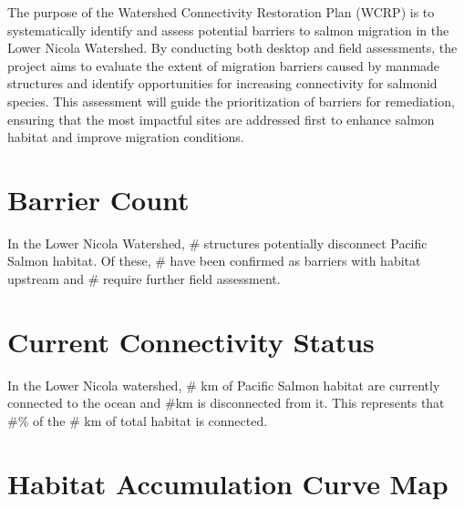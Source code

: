\documentclass[
  letterpaper,
  DIV=11,
  numbers=noendperiod]{scrreprt}
\begin{document}

The purpose of the Watershed Connectivity Restoration Plan (WCRP) is to
systematically identify and assess potential barriers to salmon
migration in the Lower Nicola Watershed. By conducting both desktop and
field assessments, the project aims to evaluate the extent of migration
barriers caused by manmade structures and identify opportunities for
increasing connectivity for salmonid species. This assessment will guide
the prioritization of barriers for remediation, ensuring that the most
impactful sites are addressed first to enhance salmon habitat and
improve migration conditions.

\hypertarget{barrier-count}{%
\section*{Barrier Count}\label{barrier-count}}


In the Lower Nicola Watershed, \# structures potentially disconnect
Pacific Salmon habitat. Of these, \# have been confirmed as barriers
with habitat upstream and \# require further field assessment.

\hypertarget{current-connectivity-status}{%
\section*{Current Connectivity
Status}\label{current-connectivity-status}}


In the Lower Nicola watershed, \# km of Pacific Salmon habitat are
currently connected to the ocean and \#km is disconnected from it. This
represents that \#\% of the \# km of total habitat is connected.

\hypertarget{habitat-accumulation-curve-map}{%
\section*{Habitat Accumulation Curve \textbar{}
Map}\label{habitat-accumulation-curve-map}}

\end{document}
